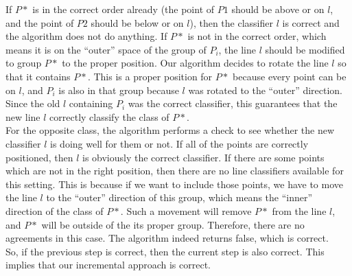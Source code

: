 If $P*$ is in the correct order already (the point of $P1$ should be above or on $l$, and the point of $P2$ should be below or on $l$), then the classifier $l$ is correct and
the algorithm does not do anything. If $P*$ is not in the correct order, which means it is on the ``outer'' space of the group of $P_i$, the line $l$ should be modified to group $P*$ to the proper position. Our algorithm decides to rotate the line $l$ so that it contains $P*$. This is a proper position for $P*$ because every point can be on $l$, and $P_i$ is also in that group because $l$ was rotated to the ``outer'' direction. Since the old $l$ containing $P_i$ was the correct classifier, this guarantees that the new line $l$ correctly classify the class of $P*$. \\ 

For the opposite class, the algorithm performs a check to see whether the new classifier $l$ is doing well for them or not. If all of the points are correctly positioned, then $l$ is obviously the correct classifier. If there are some points which are not in the right position, then there are no line classifiers available for this setting. This is because if we want to include those points, we have to move the line $l$ to the ``outer'' direction of this group, which means the ``inner'' direction of the class of $P*$. Such a movement will remove $P*$ from the line $l$, and $P*$ will be outside of the its proper group. Therefore, there are no agreements in this case. The algorithm indeed returns false, which is correct. \\

So, if the previous step is correct, then the current step is also correct. This implies that our incremental approach is correct. \\
